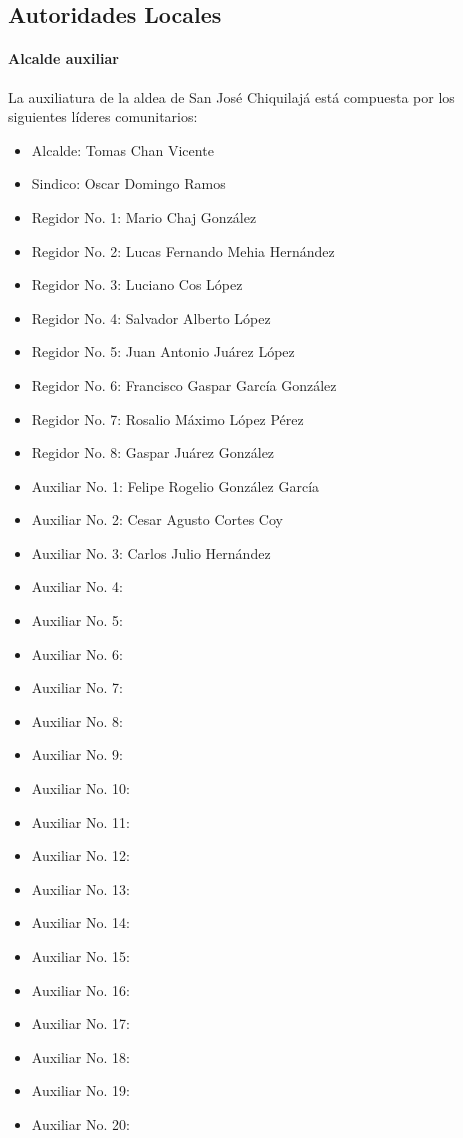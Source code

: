 \documentclass{article}
\begin{document}
\subsection{Autoridades Locales}

\paragraph{Alcalde auxiliar}
La auxiliatura de la aldea de San José Chiquilajá está compuesta por los siguientes líderes comunitarios:
\begin{itemize}
	\item Alcalde: Tomas Chan Vicente
	\item Sindico: Oscar Domingo Ramos
	\item Regidor No. 1: Mario Chaj González
	\item Regidor No. 2: Lucas Fernando Mehia Hernández
	\item Regidor No. 3: Luciano Cos López
	\item Regidor No. 4: Salvador Alberto López
	\item Regidor No. 5: Juan Antonio Juárez López
	\item Regidor No. 6: Francisco Gaspar García González
	\item Regidor No. 7: Rosalio Máximo López Pérez
	\item Regidor No. 8: Gaspar Juárez González
	\item Auxiliar No. 1: Felipe Rogelio González García
	\item Auxiliar No. 2: Cesar Agusto Cortes Coy
	\item Auxiliar No. 3: Carlos Julio Hernández
	\item Auxiliar No. 4:
	\item Auxiliar No. 5:
	\item Auxiliar No. 6:
	\item Auxiliar No. 7:
	\item Auxiliar No. 8:
	\item Auxiliar No. 9:
	\item Auxiliar No. 10:
	\item Auxiliar No. 11:
	\item Auxiliar No. 12:
	\item Auxiliar No. 13:
	\item Auxiliar No. 14:
	\item Auxiliar No. 15:
	\item Auxiliar No. 16:
	\item Auxiliar No. 17:
	\item Auxiliar No. 18:
	\item Auxiliar No. 19:
	\item Auxiliar No. 20:
\end{itemize}
\end{document}
